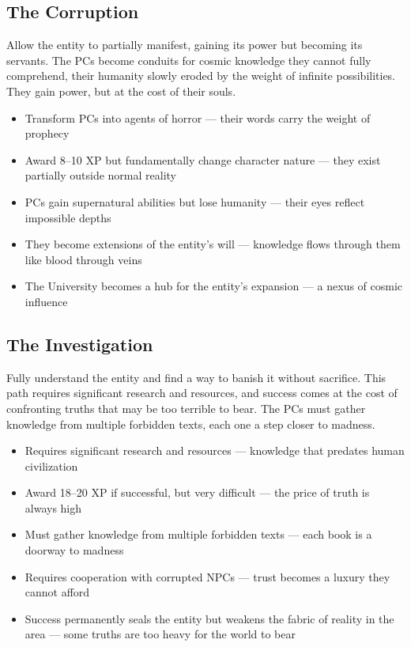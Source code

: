 \documentclass[11pt]{article}
\begin{document}
\subsection{The Corruption}

Allow the entity to partially manifest, gaining its power but becoming its servants. The PCs become conduits for cosmic knowledge they cannot fully comprehend, their humanity slowly eroded by the weight of infinite possibilities. They gain power, but at the cost of their souls.

\begin{itemize}
\item Transform PCs into agents of horror — their words carry the weight of prophecy
\item Award 8–10 XP but fundamentally change character nature — they exist partially outside normal reality
\item PCs gain supernatural abilities but lose humanity — their eyes reflect impossible depths
\item They become extensions of the entity's will — knowledge flows through them like blood through veins
\item The University becomes a hub for the entity's expansion — a nexus of cosmic influence
\end{itemize}

\subsection{The Investigation}

Fully understand the entity and find a way to banish it without sacrifice. This path requires significant research and resources, and success comes at the cost of confronting truths that may be too terrible to bear. The PCs must gather knowledge from multiple forbidden texts, each one a step closer to madness.

\begin{itemize}
\item Requires significant research and resources — knowledge that predates human civilization
\item Award 18–20 XP if successful, but very difficult — the price of truth is always high
\item Must gather knowledge from multiple forbidden texts — each book is a doorway to madness
\item Requires cooperation with corrupted NPCs — trust becomes a luxury they cannot afford
\item Success permanently seals the entity but weakens the fabric of reality in the area — some truths are too heavy for the world to bear
\end{itemize}
\end{document}
